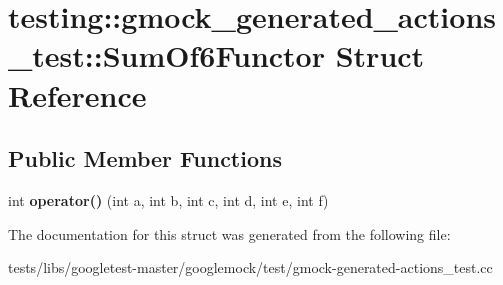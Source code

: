 \hypertarget{structtesting_1_1gmock__generated__actions__test_1_1SumOf6Functor}{}\section{testing\+:\+:gmock\+\_\+generated\+\_\+actions\+\_\+test\+:\+:Sum\+Of6\+Functor Struct Reference}
\label{structtesting_1_1gmock__generated__actions__test_1_1SumOf6Functor}
\subsection*{Public Member Functions}
\begin{DoxyCompactItemize}
\item 
\mbox{\label{structtesting_1_1gmock__generated__actions__test_1_1SumOf6Functor_adb500f7bdfa5a5887623fa38cd805e41}} 
int {\bfseries operator()} (int a, int b, int c, int d, int e, int f)
\end{DoxyCompactItemize}


The documentation for this struct was generated from the following file\+:\begin{DoxyCompactItemize}
\item 
tests/libs/googletest-\/master/googlemock/test/gmock-\/generated-\/actions\+\_\+test.\+cc\end{DoxyCompactItemize}
